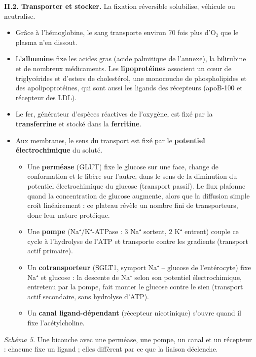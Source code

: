\documentclass[11pt,a4paper]{article}
\providecommand{\tightlist}{\setlength{\itemsep}{0pt}\setlength{\parskip}{0pt}}
\begin{document}
\textbf{II.2. Transporter et stocker.} La fixation réversible solubilise, véhicule ou neutralise.

\begin{itemize}
\tightlist
\item
  Grâce à l'hémoglobine, le sang transporte environ 70 fois plus d'O₂ que le plasma n'en dissout.
\item
  L'\textbf{albumine} fixe les acides gras (acide palmitique de l'annexe), la bilirubine et de nombreux médicaments. Les \textbf{lipoprotéines} associent un cœur de triglycérides et d'esters de cholestérol, une monocouche de phospholipides et des apolipoprotéines, qui sont aussi les ligands des récepteurs (apoB-100 et récepteur des LDL).
\item
  Le fer, générateur d'espèces réactives de l'oxygène, est fixé par la \textbf{transferrine} et stocké dans la \textbf{ferritine}.
\item
  Aux membranes, le sens du transport est fixé par le \textbf{potentiel électrochimique} du soluté.

  \begin{itemize}
  \tightlist
  \item
    Une \textbf{perméase} (GLUT) fixe le glucose sur une face, change de conformation et le libère sur l'autre, dans le sens de la diminution du potentiel électrochimique du glucose (transport passif). Le flux plafonne quand la concentration de glucose augmente, alors que la diffusion simple croît linéairement : ce plateau révèle un nombre fini de transporteurs, donc leur nature protéique.
  \item
    Une \textbf{pompe} (Na⁺/K⁺-ATPase : 3 Na⁺ sortent, 2 K⁺ entrent) couple ce cycle à l'hydrolyse de l'ATP et transporte contre les gradients (transport actif primaire).
  \item
    Un \textbf{cotransporteur} (SGLT1, symport Na⁺ -- glucose de l'entérocyte) fixe Na⁺ et glucose : la descente de Na⁺ selon son potentiel électrochimique, entretenu par la pompe, fait monter le glucose contre le sien (transport actif secondaire, sans hydrolyse d'ATP).
  \item
    Un \textbf{canal ligand-dépendant} (récepteur nicotinique) s'ouvre quand il fixe l'acétylcholine.
  \end{itemize}
\end{itemize}

\emph{Schéma 5.} Une bicouche avec une perméase, une pompe, un canal et un récepteur : chacune fixe un ligand ; elles diffèrent par ce que la liaison déclenche.
\end{document}
